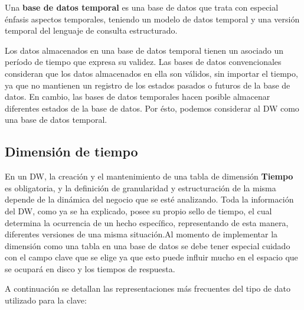 \documentclass[a4paper,11pt]{article}
\begin{document}
    Una \textbf{base de datos temporal} es una base de datos que trata con especial énfasis aspectos temporales, teniendo un modelo de datos temporal y una versión
    temporal del lenguaje de consulta estructurado.
    
    Los datos almacenados en una base de datos temporal tienen un asociado un período de tiempo que expresa su validez. Las bases de datos convencionales
    consideran que los datos almacenados en ella son válidos, sin importar el tiempo, ya que no mantienen un registro de los estados pasados o futuros de
    la base de datos. En cambio, las bases de datos temporales hacen posible almacenar diferentes estados de la base de datos. Por ésto, podemos
    considerar al DW como una base de datos temporal.
    
    
    \subsection{Dimensión de tiempo}
    
    En un DW, la creación y el mantenimiento de una tabla de dimensión \textbf{Tiempo} es obligatoria, y la definición de granularidad y estructuración de la misma 
    depende de la dinámica del negocio que se esté analizando. Toda la información del DW, como ya se ha explicado, posee su propio sello de 
    tiempo, el cual determina la ocurrencia de un hecho específico, representando de esta manera, diferentes versiones de una misma situación.Al momento de 
    implementar la dimensión como una tabla en una base de datos se debe tener especial cuidado con el campo clave que se elige ya que esto puede influir 
    mucho en el espacio que se ocupará en disco y los tiempos de respuesta.\par
    
    A continuación se detallan las representaciones más frecuentes del tipo de dato utilizado para la clave:
    
\end{document}
